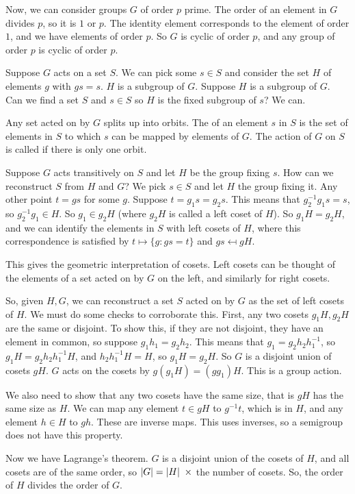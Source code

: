 \documentclass[11pt, twoside]{amsart}
\begin{document}
Now, we can consider groups $G$ of order $p$ prime. The order of an element in $G$ divides $p$, so it is $1$ or $p$. The identity element corresponds to the element of order $1$, and we have elements of order $p$. So $G$ is cyclic of order $p$, and any group of order $p$ is cyclic of order $p$.

Suppose $G$ acts on a set $S$. We can pick some $s\in S$ and consider the set $H$ of elements $g$ with $gs=s$. $H$ is a subgroup of $G$. Suppose $H$ is a subgroup of $G$. Can we find a set $S$ and $s\in S$ so $H$ is the fixed subgroup of $s$? We can.

Any set acted on by $G$ splits up into orbits. The  of an element $s$ in $S$ is the set of elements in $S$ to which $s$ can be mapped by elements of $G$. The action of $G$ on $S$ is called  if there is only one orbit.

Suppose $G$ acts transitively on $S$ and let $H$ be the group fixing $s$. How can we reconstruct $S$ from $H$ and $G$? We pick $s\in S$ and let $H$ the group fixing it. Any other point $t=gs$ for some $g$. Suppose $t=g_1s=g_2s$. This means that $g_2^{-1}g_1s=s$, so $g_2^{-1}g_1 \in H$. So $g_1 \in g_2 H$ (where $g_2H$ is called a left coset of $H$). So $g_1H=g_2H$, and we can identify the elements in $S$ with left cosets of $H$, where this correspondence is satisfied by $t\mapsto \{ g : gs = t\} $ and $gs \mapsfrom gH$.  

This gives the geometric interpretation of cosets. Left cosets can be thought of the elements of a set acted on by $G$ on the left, and similarly for right cosets.

So, given $H,G$, we can reconstruct a set $S$ acted on by $G$ as the set of left cosets of $H$. We must do some checks to corroborate this. First, any two cosets $g_1H, g_2H$ are the same or disjoint. To show this, if they are not disjoint, they have an element in common, so suppose $g_1h_1 = g_2h_2$. This means that $g_1 = g_2h_2h_1^{-1}$, so $g_1 H = g_2 h_2h_1^{-1} H$, and $h_2h_1^{-1}H = H$, so $g_1H = g_2H$. So $G$ is a disjoint union of cosets $gH$. $G$ acts on the cosets by $g(g_1H) = (gg_1)H$. This is a group action. 

We also need to show that any two cosets have the same size, that is $gH$ has the same size as $H$. We can map any element $t\in gH $ to $g^{-1}t$, which is in $H$, and any element $h\in H$ to $gh$. These are inverse maps. This uses inverses, so a {semigroup} does not have this property. 

Now we have Lagrange's theorem. $G$ is a disjoint union of the cosets of $H$, and all cosets are of the same order, so $\left \lvert G \right \rvert = \left \lvert H \right \rvert \ \times$ the number of cosets. So, the order of $H$ divides the order of $G$.
\end{document}
